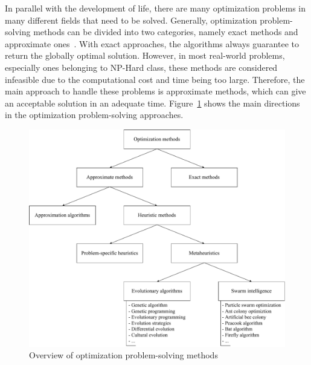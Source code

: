 In parallel with the development of life, there are many optimization problems in many different fields that need to be solved. Generally, optimization problem-solving methods can be divided into two categories, namely exact methods and approximate ones~\cite{talbi2009metaheuristics, eiben2003introduction}. With exact approaches, the algorithms always guarantee to return the globally optimal solution. However, in most real-world problems, especially ones belonging to NP-Hard class, these methods are considered infeasible due to the computational cost and time being too large. Therefore, the main approach to handle these problems is approximate methods, which can give an acceptable solution in an adequate time. Figure~\ref{fig:methos} shows the main directions in the optimization problem-solving approaches.

\setlength{\intextsep}{3pt}
\renewcommand{\scalefigure}{0.6}
\begin{figure}[htbp]
	\centering
	\includegraphics[scale=\scalefigure]{Figures/chap 1/Overview Methods.pdf}
	\caption{Overview of optimization problem-solving methods}
	\label{fig:methos}
\end{figure}

